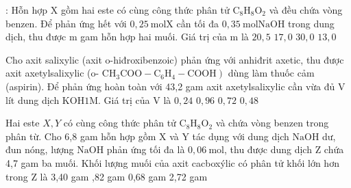 \begin{ex}[2][][(Đề MH - 2020)]
	: Hỗn hợp $\mathrm{X}$ gồm hai este có cùng công thức phân tử $\mathrm{C}_8 \mathrm{H}_8 \mathrm{O}_2$ và đều chứa vòng benzen. Để phản ứng hết với $0,25 \mathrm{~mol} \mathrm{X}$ cần tối đa $0,35 \mathrm{~mol} \mathrm{NaOH}$ trong dung dịch, thu được $\mathrm{m}$ gam hỗn hợp hai muối. Giá trị của m là
	\choice
	{%
	$ 20,5 $
}
	{%
	$ 17,0 $
}
	{%
\True	$ 30,0 $
}
	{%
	$ 13,0 $
}
\sodongkeex[6]
\end{ex}
\begin{ex}[2][][(Đề TSĐH A - 2011)]
	 Cho axit salixylic (axit o-hiđroxibenzoic) phản ứng với anhiđrit axetic, thu được axit axetylsalixylic (o- $\left.\mathrm{CH}_3 \mathrm{COO}-\mathrm{C}_6 \mathrm{H}_4-\mathrm{COOH}\right)$ dùng làm thuốc cảm (aspirin). Để phản ứng hoàn toàn với 43,2 gam axit axetylsalixylic cần vừa đủ $\mathrm{V}$ lít dung dịch $\mathrm{KOH} 1 \mathrm{M}$. Giá trị của $\mathrm{V}$ là
	\choice
	{%
		$ 0,24 $
	}
	{%
		$ 0,96 $
	}
	{%
		\True	$ 0,72 $
	}
	{%
		$  0,48 $
	}
	\sodongkeex[6]
\end{ex}
\begin{ex}[2][][(Đề TSĐH B - 2014)]
	 Hai este $X, Y$ có cùng công thức phân tử $\mathrm{C}_8 \mathrm{H}_8 \mathrm{O}_2$ và chứa vòng benzen trong phân từ. Cho 6,8 gam hỗn hợp gồm $\mathrm{X}$ và $\mathrm{Y}$ tác dụng với dung dịch $\mathrm{NaOH}$ dư, đun nóng, lượng $\mathrm{NaOH}$ phản ứng tối đa là $0,06 \mathrm{~mol}$, thu được dung dịch $\mathrm{Z}$ chứa 4,7 gam ba muối. Khối lượng muối của axit cacboxýlic có phân tử khối lớn hơn trong $\mathrm{Z}$ là
	\choice
	{%
		3,40 gam
	}
	{%
		,82 gam
	}
	{%
		0,68 gam
	}
	{%
		2,72 gam
	}
	\sodongkeex[6]
\end{ex}


